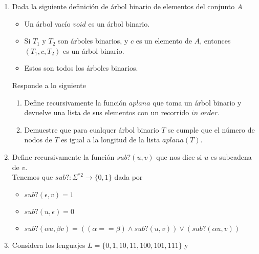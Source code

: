 \documentclass{article}
\begin{document}
\begin{enumerate}
{\begin{enumerate}
            \end{enumerate}
        }
        \item {
            Dada la siguiente definición de árbol binario de elementos del 
            conjunto $A$
            \begin{itemize}
                \item {
                    Un árbol vacío $void$ es un árbol binario.
                }
                \item {
                    Si $T_1$ y $T_2$ son árboles binarios, y $c$ es un elemento 
                    de $A$, entonces $(T_1, c, T_2)$ es un árbol binario.
                }
                \item {
                    Estos son todos los árboles binarios.
                }
            \end{itemize}
            Responde a lo siguiente
            \begin{enumerate}
                \item {
                    Define recursivamente la función $aplana$ que toma
                    un árbol binario y devuelve una lista de sus elementos con 
                    un recorrido $\textit{in order}$.
                }
                \item {
                    Demuestre que para cualquer árbol binario $T$ se cumple que
                    el número de nodos de $T$ es igual a la longitud de la lista 
                    $aplana(T)$.
                }
            \end{enumerate}
        }
        \item {
            Define recursivamente la función $sub?(u, v)$ que nos dice si $u$ 
            es subcadena de $v$.\\
            Tenemos que $sub?: \Sigma^{*2} \rightarrow \{0, 1\}$ dada por
            \begin{itemize}
                \item {
                    $sub? (\epsilon, v) = 1$
                }
                \item {
                    $sub? (u, \epsilon) = 0$
                }
                \item {
                    $sub?(\alpha u, \beta v) = ((\alpha == \beta) 
                    \wedge sub?(u, v)) \vee (sub?(\alpha u, v))$
                }
            \end{itemize}
        }
        \item {
            Considera los lenguajes $L = \{ 0, 1, 10, 11, 100, 101, 111 \}$ y 
}
\end{enumerate}
\end{document}
